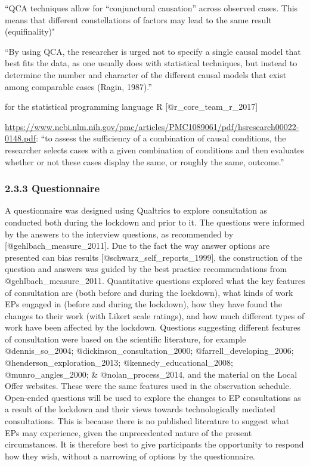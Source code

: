 \documentclass[
]{article}
\begin{document}
``QCA techniques allow for ``conjunctural causation'' across observed
cases. This means that different constellations of factors may lead to
the same result (equifinality)"

``By using QCA, the researcher is urged not to specify a single causal
model that best fits the data, as one usually does with statistical
techniques, but instead to determine the number and character of the
different causal models that exist among comparable cases (Ragin,
1987).''

for the statistical programming language R {[}@r\_core\_team\_r\_2017{]}

\url{https://www.ncbi.nlm.nih.gov/pmc/articles/PMC1089061/pdf/hsresearch00022-0148.pdf}:
``to assess the sufficiency of a combination of causal conditions, the
researcher selects cases with a given combination of conditions and then
evaluates whether or not these cases display the same, or roughly the
same, outcome.''

\hypertarget{questionnaire}{%
\subsubsection{2.3.3 Questionnaire}\label{questionnaire}}

A questionnaire was designed using Qualtrics to explore consultation as
conducted both during the lockdown and prior to it. The questions were
informed by the answers to the interview questions, as recommended by
{[}@gehlbach\_measure\_2011{]}. Due to the fact the way answer options
are presented can bias results {[}@schwarz\_self\_reports\_1999{]}, the
construction of the question and answers was guided by the best practice
recommendations from @gehlbach\_measure\_2011. Quantitative questions
explored what the key features of consultation are (both before and
during the lockdown), what kinds of work EPs engaged in (before and
during the lockdown), how they have found the changes to their work
(with Likert scale ratings), and how much different types of work have
been affected by the lockdown. Questions suggesting different features
of consultation were based on the scientific literature, for example
@dennis\_so\_2004; @dickinson\_consultation\_2000;
@farrell\_developing\_2006; @henderson\_exploration\_2013;
@kennedy\_educational\_2008; @munro\_angles\_2000; \&
@nolan\_process\_2014, and the material on the Local Offer websites.
These were the same features used in the observation schedule.
Open-ended questions will be used to explore the changes to EP
consultations as a result of the lockdown and their views towards
technologically mediated consultations. This is because there is no
published literature to suggest what EPs may experience, given the
unprecedented nature of the present circumstances. It is therefore best
to give participants the opportunity to respond how they wish, without a
narrowing of options by the questionnaire.
\end{document}
